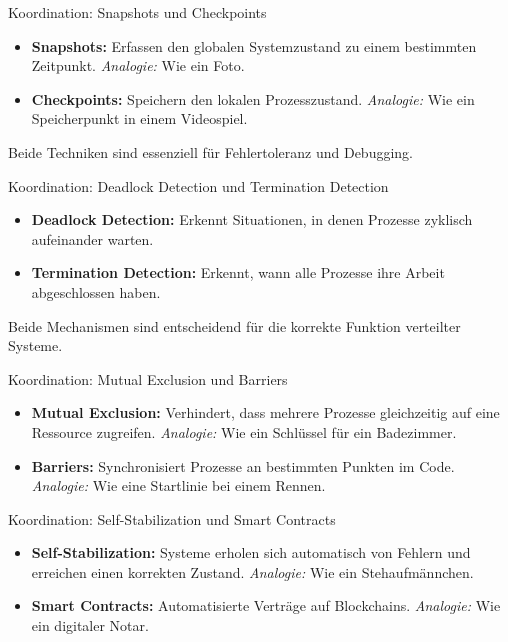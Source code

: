 \documentclass{beamer}
\begin{document}
\begin{frame}{Koordination: Snapshots und Checkpoints}
    \begin{itemize}
        \item \textbf{Snapshots:} Erfassen den globalen Systemzustand zu einem bestimmten Zeitpunkt. \newline \textit{Analogie:} Wie ein Foto.
        \item \textbf{Checkpoints:} Speichern den lokalen Prozesszustand. \newline \textit{Analogie:} Wie ein Speicherpunkt in einem Videospiel.
    \end{itemize}
    Beide Techniken sind essenziell für Fehlertoleranz und Debugging.
\end{frame}

\begin{frame}{Koordination: Deadlock Detection und Termination Detection}
    \begin{itemize}
        \item \textbf{Deadlock Detection:} Erkennt Situationen, in denen Prozesse zyklisch aufeinander warten.
        \item \textbf{Termination Detection:} Erkennt, wann alle Prozesse ihre Arbeit abgeschlossen haben.
    \end{itemize}
    Beide Mechanismen sind entscheidend für die korrekte Funktion verteilter Systeme.
\end{frame}

\begin{frame}{Koordination: Mutual Exclusion und Barriers}
    \begin{itemize}
        \item \textbf{Mutual Exclusion:} Verhindert, dass mehrere Prozesse gleichzeitig auf eine Ressource zugreifen. \newline \textit{Analogie:} Wie ein Schlüssel für ein Badezimmer.
        \item \textbf{Barriers:} Synchronisiert Prozesse an bestimmten Punkten im Code. \newline \textit{Analogie:} Wie eine Startlinie bei einem Rennen.
    \end{itemize}
\end{frame}

\begin{frame}{Koordination: Self-Stabilization und Smart Contracts}
    \begin{itemize}
        \item \textbf{Self-Stabilization:} Systeme erholen sich automatisch von Fehlern und erreichen einen korrekten Zustand. \newline \textit{Analogie:} Wie ein Stehaufmännchen.
        \item \textbf{Smart Contracts:} Automatisierte Verträge auf Blockchains. \newline \textit{Analogie:} Wie ein digitaler Notar.
    \end{itemize}
\end{frame}
\end{document}
